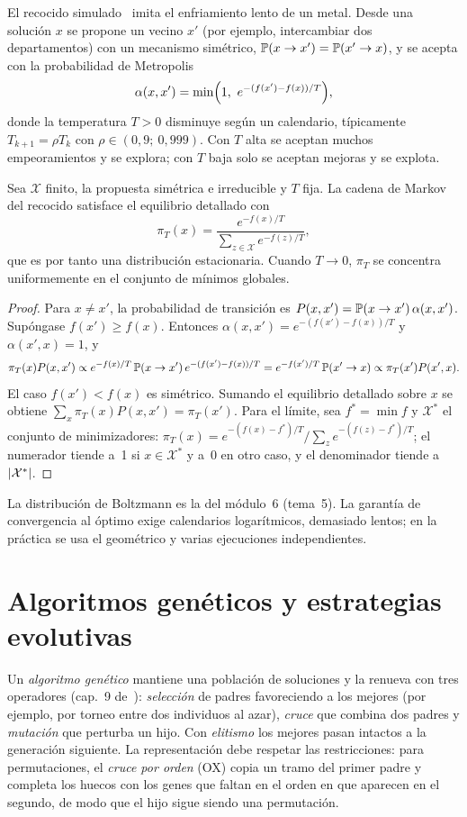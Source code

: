 El recocido simulado~\cite{kirkpatrick} imita el enfriamiento lento de un metal. Desde una solución $x$ se propone un vecino $x'$ (por ejemplo, intercambiar dos departamentos) con un mecanismo simétrico, $\mathbb{P}(x\to x')=\mathbb{P}(x'\to x)$, y se acepta con la probabilidad de Metropolis
\[
\alpha(x,x')=\min\Bigl(1,\ e^{-(f(x')-f(x))/T}\Bigr),
\]
donde la temperatura $T>0$ disminuye según un calendario, típicamente $T_{k+1}=\rho T_k$ con $\rho\in(0{,}9;\ 0{,}999)$. Con $T$ alta se aceptan muchos empeoramientos y se explora; con $T$ baja solo se aceptan mejoras y se explota.

\begin{proposicion}\label{prop:boltzmann}
Sea $\mathcal{X}$ finito, la propuesta simétrica e irreducible y $T$ fija. La cadena de Markov del recocido satisface el equilibrio detallado con
\[
\pi_T(x)=\frac{e^{-f(x)/T}}{\sum_{z\in\mathcal{X}}e^{-f(z)/T}},
\]
que es por tanto una distribución estacionaria. Cuando $T\to 0$, $\pi_T$ se concentra uniformemente en el conjunto de mínimos globales.
\end{proposicion}

\begin{proof}
Para $x\ne x'$, la probabilidad de transición es $P(x,x')=\mathbb{P}(x\to x')\,\alpha(x,x')$. Supóngase $f(x')\ge f(x)$. Entonces $\alpha(x,x')=e^{-(f(x')-f(x))/T}$ y $\alpha(x',x)=1$, y
\[
\pi_T(x)P(x,x')\propto e^{-f(x)/T}\,\mathbb{P}(x\to x')\,e^{-(f(x')-f(x))/T}=e^{-f(x')/T}\,\mathbb{P}(x'\to x)\propto\pi_T(x')P(x',x).
\]
El caso $f(x')<f(x)$ es simétrico. Sumando el equilibrio detallado sobre $x$ se obtiene $\sum_x\pi_T(x)P(x,x')=\pi_T(x')$. Para el límite, sea $f^{*}=\min f$ y $\mathcal{X}^{*}$ el conjunto de minimizadores: $\pi_T(x)=e^{-(f(x)-f^{*})/T}/\sum_z e^{-(f(z)-f^{*})/T}$; el numerador tiende a~1 si $x\in\mathcal{X}^{*}$ y a~0 en otro caso, y el denominador tiende a $\lvert\mathcal{X}^{*}\rvert$.
\end{proof}

La distribución de Boltzmann es la del módulo~6 (tema~5). La garantía de convergencia al óptimo exige calendarios logarítmicos, demasiado lentos; en la práctica se usa el geométrico y varias ejecuciones independientes.

\section{Algoritmos genéticos y estrategias evolutivas}

Un \emph{algoritmo genético} mantiene una población de soluciones y la renueva con tres operadores (cap.~9 de~\cite{kw}): \emph{selección} de padres favoreciendo a los mejores (por ejemplo, por torneo entre dos individuos al azar), \emph{cruce} que combina dos padres y \emph{mutación} que perturba un hijo. Con \emph{elitismo} los mejores pasan intactos a la generación siguiente. La representación debe respetar las restricciones: para permutaciones, el \emph{cruce por orden} (OX) copia un tramo del primer padre y completa los huecos con los genes que faltan en el orden en que aparecen en el segundo, de modo que el hijo sigue siendo una permutación.

